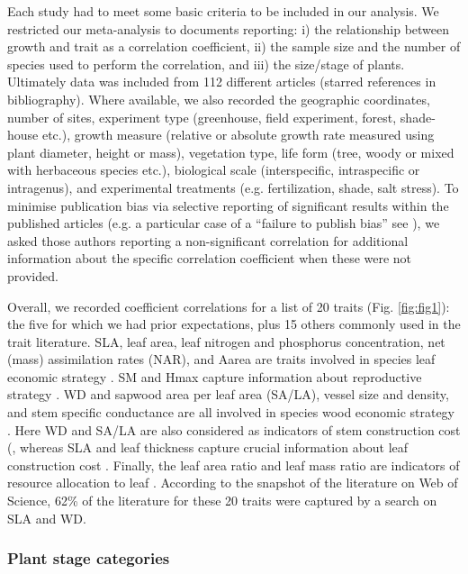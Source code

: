 \documentclass[a4paper,11pt]{article}
\begin{document}
Each study had to meet some basic criteria to be included in our analysis. We restricted our meta-analysis to documents reporting: i) the relationship between growth and trait as a correlation coefficient, ii) the sample size and the number of species used to perform the correlation, and iii) the size/stage of plants. Ultimately data was included from 112 different articles (starred references in bibliography). Where available, we also recorded the geographic coordinates, number of sites, experiment type (greenhouse, field experiment, forest, shade-house etc.), growth measure (relative or absolute growth rate measured using plant diameter, height or mass), vegetation type, life form (tree, woody or mixed with herbaceous species etc.), biological scale (interspecific, intraspecific or intragenus), and experimental treatments (e.g. fertilization, shade, salt stress). To minimise publication bias via selective reporting of significant results within the published articles (e.g. a particular case of a ``failure to publish bias'' see \citealt{Jennions:2013ta}), we asked those authors reporting a non-significant correlation for additional information about the specific correlation coefficient when these were not provided.

Overall, we recorded coefficient correlations for a list of 20 traits (Fig. \ref{fig:fig1}): the five for which we had prior expectations, plus 15 others commonly used in the trait literature. SLA, leaf area, leaf nitrogen and phosphorus concentration, net (mass) assimilation rates (NAR), and Aarea are traits involved in species leaf economic strategy \citep{Wright:2004jb,Wright:2010tp}. SM and Hmax capture information about reproductive strategy \citep{Falster:2005bw,Moles:2006ft}. WD and sapwood area per leaf area (SA/LA), vessel size and density, and stem specific conductance are all involved in species wood economic strategy  \citep{Chave:2009iy}. Here WD and SA/LA are also considered as indicators of stem construction cost (\citep{Falster:2011ii}, whereas SLA and leaf thickness capture crucial information about leaf construction cost \citep{Wright:2004jb}. Finally, the leaf area ratio and leaf mass ratio are indicators of resource allocation to leaf \citep{Lambers:1992bj}. According to the snapshot of the literature on Web of Science, 62\% of the literature for these 20 traits were captured by a search on SLA and WD.

\subsubsection*{Plant stage categories}\label{plant-stage-categories}
\end{document}
